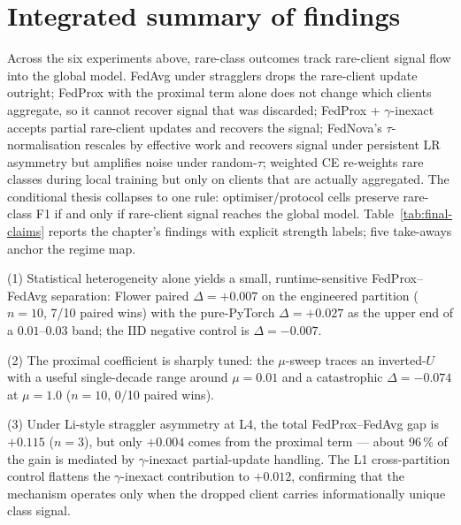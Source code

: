 
\section{Integrated summary of findings}
\label{sec:integrated-summary}

Across the six experiments above, rare-class outcomes track rare-client
signal flow into the global model. FedAvg under stragglers drops the
rare-client update outright; FedProx with the proximal term alone does
not change which clients aggregate, so it cannot recover signal that was
discarded; FedProx + $\gamma$-inexact accepts partial rare-client updates
and recovers the signal; FedNova's $\tau$-normalisation rescales by
effective work and recovers signal under persistent LR asymmetry but
amplifies noise under random-$\tau$; weighted CE re-weights rare classes
during local training but only on clients that are actually aggregated.
The conditional thesis collapses to one rule: optimiser/protocol cells
preserve rare-class F1 if and only if rare-client signal reaches the
global model. Table~\ref{tab:final-claims} reports the chapter's findings
with explicit strength labels; five take-aways anchor the regime map.

(1) Statistical heterogeneity alone yields a small, runtime-sensitive
FedProx--FedAvg separation: Flower paired $\Delta = +0.007$ on the
engineered partition ($n=10$, 7/10 paired wins) with the pure-PyTorch
$\Delta = +0.027$ as the upper end of a $0.01$--$0.03$ band; the IID
negative control is $\Delta = -0.007$.

(2) The proximal coefficient is sharply tuned: the $\mu$-sweep traces an
inverted-$U$ with a useful single-decade range around $\mu = 0.01$ and a
catastrophic $\Delta = -0.074$ at $\mu = 1.0$ ($n=10$, 0/10 paired wins).

(3) Under Li-style straggler asymmetry at L4, the total FedProx--FedAvg gap
is $+0.115$ ($n=3$), but only $+0.004$ comes from the proximal term ---
about $96\,\%$ of the gain is mediated by $\gamma$-inexact partial-update
handling. The L1 cross-partition control flattens the $\gamma$-inexact
contribution to $+0.012$, confirming that the mechanism operates only when
the dropped client carries informationally unique class signal.

